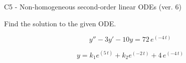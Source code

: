 \begin{exercise}
  \begin{exerciseTitle}C5 - Non-homogeneous second-order linear ODEs (ver. 6)\end{exerciseTitle}
  \begin{exerciseStatement}
    
Find the solution to the given ODE.

    
\[y''-3y'-10y = 72 \, e^{\left(-4 \, t\right)}\]

  \end{exerciseStatement}
  \begin{exerciseAnswer}
    
\[y= k_{1} e^{\left(5 \, t\right)} + k_{2} e^{\left(-2 \, t\right)} + 4 \, e^{\left(-4 \, t\right)}\]

  \end{exerciseAnswer}
\end{exercise}